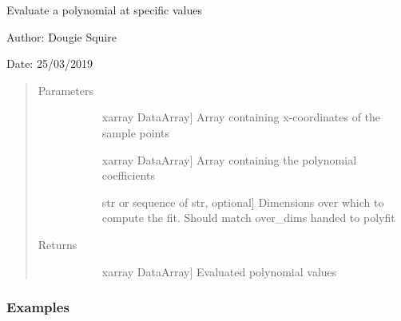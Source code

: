 \documentclass[letterpaper,10pt,english]{sphinxmanual}
\begin{document}

\begin{fulllineitems}
\label{\detokenize{utils_doc:utils.polyval}}
Evaluate a polynomial at specific values

\begin{DUlineblock}{0em}
\item[] Author: Dougie Squire
\item[] Date: 25/03/2019
\end{DUlineblock}
\begin{quote}\begin{description}
\item[{Parameters}] \leavevmode\begin{description}
\item[{}] \leavevmode{[}xarray DataArray{]}
Array containing x-coordinates of the sample points

\item[{}] \leavevmode{[}xarray DataArray{]}
Array containing the polynomial coefficients

\item[{}] \leavevmode{[}str or sequence of str, optional{]}
Dimensions over which to compute the fit. Should match over\_dims handed to polyfit

\end{description}

\item[{Returns}] \leavevmode\begin{description}
\item[{}] \leavevmode{[}xarray DataArray{]}
Evaluated polynomial values

\end{description}

\end{description}\end{quote}






\subsubsection*{Examples}


\end{fulllineitems}
\end{document}

